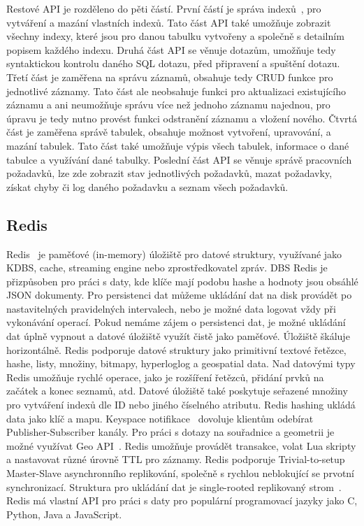 \documentclass[czech,master,dept460,male,csharp,cpdeclaration]{diploma}
\begin{document}
	Restové API je rozděleno do pěti částí. První částí je správa indexů~\cite{index}, pro vytváření a mazání vlastních indexů. Tato část API také umožňuje zobrazit všechny indexy, které jsou pro danou tabulku vytvořeny a společně s detailním popisem každého indexu. Druhá část API se věnuje dotazům, umožňuje tedy syntaktickou kontrolu daného SQL dotazu, před připravení a spuštění dotazu. Třetí část je zaměřena na správu záznamů, obsahuje tedy CRUD funkce pro jednotlivé záznamy. Tato část ale neobsahuje funkci pro aktualizaci existujícího záznamu a ani neumožňuje správu více než jednoho záznamu najednou, pro úpravu je tedy nutno provést funkci odstranění záznamu a vložení nového. Čtvrtá část je zaměřena správě tabulek, obsahuje možnost vytvoření, upravování, a mazání tabulek. Tato část také umožňuje výpis všech tabulek, informace o dané tabulce a využívání dané tabulky. Poslední část API se věnuje správě pracovních požadavků, lze zde zobrazit stav jednotlivých požadavků, mazat požadavky, získat chyby či log daného požadavku a seznam všech požadavků.
		
	\subsection{Redis} \label{lab-redis}
	
	Redis~\cite{redis} je paměťové (in-memory) úložiště pro datové struktury, využívané jako KDBS, cache, streaming engine nebo zprostředkovatel zpráv. DBS Redis je přizpůsoben pro práci s daty, kde klíče mají podobu hashe a hodnoty jsou obsáhlé JSON dokumenty. Pro persistenci dat můžeme ukládání dat na disk provádět po nastavitelných pravidelných intervalech, nebo je možné data logovat vždy při vykonávání operací. Pokud nemáme zájem o persistenci dat, je možné ukládání dat úplně vypnout a datové úložiště využít čistě jako paměťové. Úložiště škáluje horizontálně. Redis podporuje datové struktury jako primitivní textové řetězce, hashe, listy, množiny, bitmapy, hyperloglog a geospatial data. Nad datovými typy Redis umožňuje rychlé operace, jako je rozšíření řetězců, přidání prvků na začátek a konec seznamů, atd. Datové úložiště také poskytuje seřazené množiny pro vytváření indexů dle ID nebo jiného číselného atributu. Redis hashing ukládá data jako klíč a mapu. Keyspace notifikace~\cite{redis-keyspace-not} dovoluje klientům odebírat Publisher-Subscriber kanály. Pro práci s dotazy na souřadnice a geometrii je možné využívat Geo API~\cite{redis-geospatial}. Redis umožňuje provádět transakce, volat Lua skripty a nastavovat různé úrovně TTL pro záznamy. Redis podporuje Trivial-to-setup Master-Slave asynchronního replikování, společně s rychlou neblokující se prvotní synchronizací. Struktura pro ukládání dat je single-rooted replikovaný strom~\cite{tree-replic}. Redis má vlastní API pro práci s daty pro populární programovací jazyky jako C, Python, Java a JavaScript.
	
\end{document}
